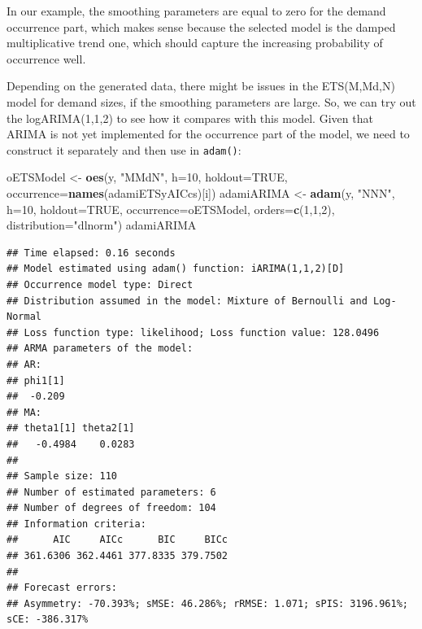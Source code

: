 \documentclass[]{book}
\newenvironment{Shaded}{\begin{snugshade}}{\end{snugshade}}
\newcommand{\DataTypeTok}[1]{\textcolor[rgb]{0.13,0.29,0.53}{#1}}
\newcommand{\DecValTok}[1]{\textcolor[rgb]{0.00,0.00,0.81}{#1}}
\newcommand{\KeywordTok}[1]{\textcolor[rgb]{0.13,0.29,0.53}{\textbf{#1}}}
\newcommand{\NormalTok}[1]{#1}
\newcommand{\OtherTok}[1]{\textcolor[rgb]{0.56,0.35,0.01}{#1}}
\newcommand{\StringTok}[1]{\textcolor[rgb]{0.31,0.60,0.02}{#1}}
\theoremstyle{definition}
\theoremstyle{definition}
\theoremstyle{definition}
\theoremstyle{definition}
\theoremstyle{remark}
\begin{document}
In our example, the smoothing parameters are equal to zero for the demand occurrence part, which makes sense because the selected model is the damped multiplicative trend one, which should capture the increasing probability of occurrence well.

Depending on the generated data, there might be issues in the ETS(M,Md,N) model for demand sizes, if the smoothing parameters are large. So, we can try out the logARIMA(1,1,2) to see how it compares with this model. Given that ARIMA is not yet implemented for the occurrence part of the model, we need to construct it separately and then use in \texttt{adam()}:

\begin{Shaded}
\begin{Highlighting}[]
\NormalTok{oETSModel <-}\StringTok{ }\KeywordTok{oes}\NormalTok{(y, }\StringTok{"MMdN"}\NormalTok{, }\DataTypeTok{h=}\DecValTok{10}\NormalTok{, }\DataTypeTok{holdout=}\OtherTok{TRUE}\NormalTok{,}
                 \DataTypeTok{occurrence=}\KeywordTok{names}\NormalTok{(adamiETSyAICcs)[i])}
\NormalTok{adamiARIMA <-}\StringTok{ }\KeywordTok{adam}\NormalTok{(y, }\StringTok{"NNN"}\NormalTok{, }\DataTypeTok{h=}\DecValTok{10}\NormalTok{, }\DataTypeTok{holdout=}\OtherTok{TRUE}\NormalTok{,}
                   \DataTypeTok{occurrence=}\NormalTok{oETSModel,}
                   \DataTypeTok{orders=}\KeywordTok{c}\NormalTok{(}\DecValTok{1}\NormalTok{,}\DecValTok{1}\NormalTok{,}\DecValTok{2}\NormalTok{),}
                   \DataTypeTok{distribution=}\StringTok{"dlnorm"}\NormalTok{)}
\NormalTok{adamiARIMA}
\end{Highlighting}
\end{Shaded}

\begin{verbatim}
## Time elapsed: 0.16 seconds
## Model estimated using adam() function: iARIMA(1,1,2)[D]
## Occurrence model type: Direct
## Distribution assumed in the model: Mixture of Bernoulli and Log-Normal
## Loss function type: likelihood; Loss function value: 128.0496
## ARMA parameters of the model:
## AR:
## phi1[1] 
##  -0.209 
## MA:
## theta1[1] theta2[1] 
##   -0.4984    0.0283 
## 
## Sample size: 110
## Number of estimated parameters: 6
## Number of degrees of freedom: 104
## Information criteria:
##      AIC     AICc      BIC     BICc 
## 361.6306 362.4461 377.8335 379.7502 
## 
## Forecast errors:
## Asymmetry: -70.393%; sMSE: 46.286%; rRMSE: 1.071; sPIS: 3196.961%; sCE: -386.317%
\end{verbatim}
\end{document}
